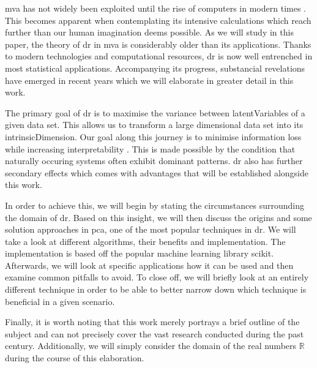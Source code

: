 \Gls{mva} has not widely been exploited until the rise of computers in modern times \cite{Jolliffe2002book}.
This becomes apparent when contemplating its intensive calculations which reach further than our human imagination deems possible.
As we will study in this paper, the theory of \gls{dr} in \gls{mva} is considerably older than its applications.
Thanks to modern technologies and computational resources, \gls{dr} is now well entrenched in most statistical applications.
Accompanying its progress, substancial revelations have emerged in recent years which we will elaborate in greater detail in this work.
\bigskip


The primary goal of \gls{dr} is to maximise the variance between \glspl{latentVariable} of a given data set.
This allows us to transform a large dimensional data set into its \gls{intrinsicDimension}.
Our goal along this journey is to minimise information loss while increasing interpretability \cite{jolliffe2016principal}.
This is made possible by the condition that naturally occuring systems often exhibit dominant patterns.
\Gls{dr} also has further secondary effects which comes with advantages that will be established alongside this work.
\medskip

In order to achieve this, we will begin by stating the circumstances surrounding the domain of \gls{dr}.
Based on this insight, we will then discuss the origins and some solution approaches in \gls{pca}, one of the most popular techniques in \gls{dr}.
We will take a look at different algorithms, their benefits and implementation.
The implementation is based off the popular machine learning library \gls{scikit}.
Afterwards, we will look at specific applications how it can be used and then examine common pitfalls to avoid.
To close off, we will briefly look at an entirely different technique in order to be able to better narrow down which technique is beneficial in a given scenario.
\bigskip


Finally, it is worth noting that this work merely portrays a brief outline of the subject and can not precisely cover the vast research conducted during the past century.
Additionally, we will simply consider the domain of the real numbers $\mathbb{R}$ during the course of this elaboration.



